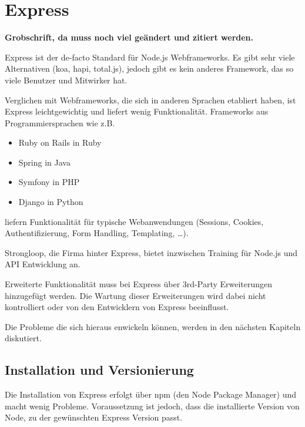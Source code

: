 \chapter{Express}\label{express-michi}

\textbf{Grobschrift, da muss noch viel geändert und zitiert werden.}

Express ist der de-facto Standard für Node.js Webframeworks. Es gibt
sehr viele Alternativen (koa\cite{koa}, hapi\cite{hapi}, total.js\cite{totaljs}), jedoch gibt es
kein anderes Framework, das so viele Benutzer und Mitwirker hat.


Verglichen mit Webframeworks, die sich in anderen Sprachen etabliert
haben, ist Express leichtgewichtig und liefert wenig Funktionalität.
Frameworks aus Programmiersprachen wie z.B.

\begin{itemize}
\item
  Ruby on Rails in Ruby
\item
  Spring in Java
\item
  Symfony in PHP
\item
  Django in Python
\end{itemize}

liefern Funktionalität für typische Webanwendungen (Sessions, Cookies,
Authentifizierung, Form Handling, Templating, \ldots{}).

Strongloop\cite{strongloop}, die Firma hinter Express, bietet inzwischen Training für Node.js und API
Entwicklung an.

Erweiterte Funktionalität muss bei Express über 3rd-Party Erweiterungen
hinzugefügt werden. Die Wartung dieser Erweiterungen wird dabei nicht
kontrolliert oder von den Entwicklern von Express beeinflusst.

Die Probleme die sich hieraus enwickeln können, werden in den nächsten Kapiteln diskutiert.

\section{Installation und
Versionierung}\label{installation-und-versionierung}

Die Installation von Express erfolgt über npm (den Node Package Manager)
und macht wenig Probleme. Voraussetzung ist jedoch, dass die
installierte Version von Node, zu der gewünschten Express Version passt.

